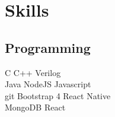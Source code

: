 \documentclass[]{Ayushi-resume}
\begin{document}
\begin{minipage}[t]{0.33\textwidth}
\vspace{\topsep}
\vspace{\topsep}
\section{Skills}
\vspace{\topsep}
\subsection{Programming}
C \textbullet{} C++ \textbullet{} Verilog \\
Java \textbullet{} NodeJS \textbullet{} Javascript\\
git \textbullet{} 
Bootstrap 4 \textbullet{} React Native\\ 
MongoDB  \textbullet{} React \\
\sectionsep

%
%

\end{minipage} 
\hfill
\end{document}
